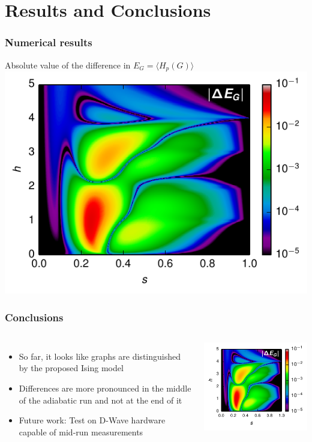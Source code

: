 \documentclass{beamer}
\newcommand{\ev}[1]{\langle #1 \rangle} %
\begin{document}
\section{Results and Conclusions}

\begin{frame}
  \frametitle{Numerical results}
  \begin{center}
    Absolute value of the difference in $E_G=\ev{H_p(G)}$
    \bigskip
    \includegraphics{delta-Eg-big}
  \end{center}
\end{frame}

\begin{frame}
  \frametitle{Conclusions}
  \begin{columns}
    \begin{itemize}
      \item So far, it looks like graphs are distinguished by the proposed
        Ising model
      \item Differences are more pronounced in the middle of the adiabatic run
        and not at the end of it
      \item \alert{Future work:} Test on D-Wave hardware capable of mid-run
        measurements
    \end{itemize}
    
    \includegraphics{delta-Eg}
  \end{columns}
\end{frame}
\end{document}
